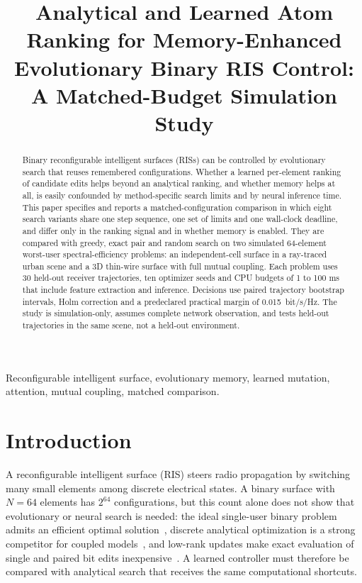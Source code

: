 \documentclass[conference]{IEEEtran}
\begin{document}
\title{Analytical and Learned Atom Ranking for Memory-Enhanced Evolutionary Binary RIS Control: A Matched-Budget Simulation Study}
\author{
}
\maketitle

\begin{abstract}
Binary reconfigurable intelligent surfaces (RISs) can be controlled by evolutionary search that reuses remembered configurations. Whether a learned per-element ranking of candidate edits helps beyond an analytical ranking, and whether memory helps at all, is easily confounded by method-specific search limits and by neural inference time. This paper specifies and reports a matched-configuration comparison in which eight search variants share one step sequence, one set of limits and one wall-clock deadline, and differ only in the ranking signal and in whether memory is enabled. They are compared with greedy, exact pair and random search on two simulated 64-element worst-user spectral-efficiency problems: an independent-cell surface in a ray-traced urban scene and a 3D thin-wire surface with full mutual coupling. Each problem uses 30 held-out receiver trajectories, ten optimizer seeds and CPU budgets of 1 to 100 ms that include feature extraction and inference. Decisions use paired trajectory bootstrap intervals, Holm correction and a predeclared practical margin of 0.015~bit/s/Hz. \resAbstractOutcome{} The study is simulation-only, assumes complete network observation, and tests held-out trajectories in the same scene, not a held-out environment.
\end{abstract}

\begin{IEEEkeywords}
Reconfigurable intelligent surface, evolutionary memory, learned mutation, attention, mutual coupling, matched comparison.
\end{IEEEkeywords}

\section{Introduction}
A reconfigurable intelligent surface (RIS) steers radio propagation by switching many small elements among discrete electrical states. A binary surface with $N=64$ elements has $2^{64}$ configurations, but this count alone does not show that evolutionary or neural search is needed: the ideal single-user binary problem admits an efficient optimal solution~\cite{zhang}, discrete analytical optimization is a strong competitor for coupled models~\cite{hammami}, and low-rank updates make exact evaluation of single and paired bit edits inexpensive~\cite{prodhomme}. A learned controller must therefore be compared with analytical search that receives the same computational shortcuts.
\end{document}
